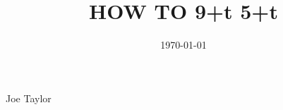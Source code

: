 \documentclass[12pt, dvipsnames, svgnames]{cmspaper} %
\renewcommand{\lstlistoflistings}{\listoflistings}
\begin{document}
\begin{titlepage}

   \date{\today}

  \title{HOW TO 9+t \Longrightarrow \bf{5+t}}

  \begin{Authlist}
    Joe Taylor
  \end{Authlist}

\end{titlepage}

\tableofcontents %

\newpage
{} %








\end{document}
